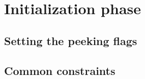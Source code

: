 
\section{Initialization phase         \lispDone{}}
\subsection{Setting the peeking flags \lispDone{}}   \label{hub: initialization phase: setting peeking flags}    
\subsection{Common constraints        \lispDone{}}   \label{hub: initialization phase: setting peeking flags}    
